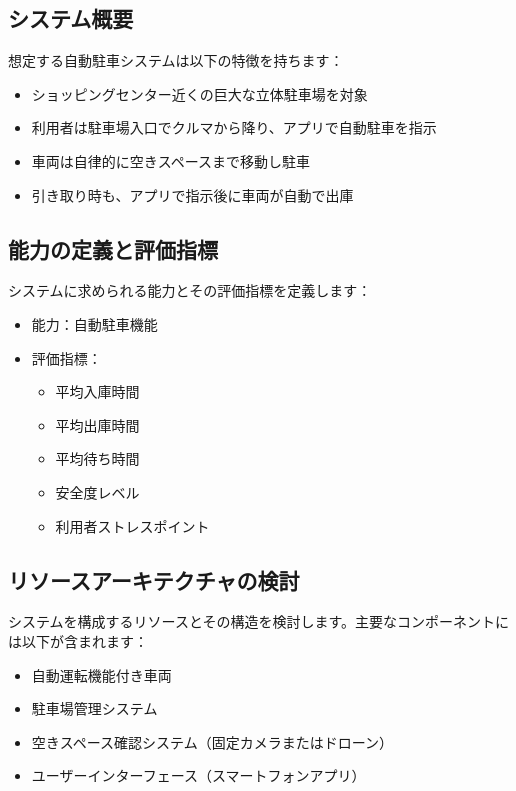 \subsection{システム概要}

想定する自動駐車システムは以下の特徴を持ちます：

\begin{itemize}
    \item ショッピングセンター近くの巨大な立体駐車場を対象
    \item 利用者は駐車場入口でクルマから降り、アプリで自動駐車を指示
    \item 車両は自律的に空きスペースまで移動し駐車
    \item 引き取り時も、アプリで指示後に車両が自動で出庫
\end{itemize}

\subsection{能力の定義と評価指標}

システムに求められる能力とその評価指標を定義します：

\begin{itemize}
    \item 能力：自動駐車機能
    \item 評価指標：
    \begin{itemize}
        \item 平均入庫時間
        \item 平均出庫時間
        \item 平均待ち時間
        \item 安全度レベル
        \item 利用者ストレスポイント
    \end{itemize}
\end{itemize}

\subsection{リソースアーキテクチャの検討}

システムを構成するリソースとその構造を検討します。主要なコンポーネントには以下が含まれます：

\begin{itemize}
    \item 自動運転機能付き車両
    \item 駐車場管理システム
    \item 空きスペース確認システム（固定カメラまたはドローン）
    \item ユーザーインターフェース（スマートフォンアプリ）
\end{itemize}

